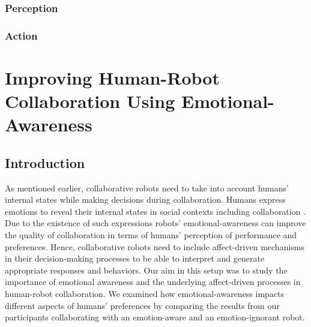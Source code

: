 \documentclass[12pt]{report}
\begin{document}
\subsection{Perception}

\subsection{Action}

\chapter{Improving Human-Robot Collaboration Using Emotional-Awareness}
\label{ch:awareness}

\section{Introduction}

As mentioned earlier, collaborative robots need to take into account humans'
internal states while making decisions during collaboration. Humans express
emotions to reveal their internal states in social contexts including
collaboration \cite{breazeal:sociable-interactive-robots}. Due to the existence
of such expressions robots' emotional-awareness can improve the quality of
collaboration in terms of humans' perception of performance and preferences.
Hence, collaborative robots need to include affect-driven mechanisms in their
decision-making processes to be able to interpret and generate appropriate
responses and behaviors. Our aim in this setup was to study the importance of
emotional awareness and the underlying affect-driven processes in human-robot
collaboration. We examined how emotional-awareness impacts different aspects of
humans' preferences by comparing the results from our participants collaborating
with an emotion-aware and an emotion-ignorant robot.

% 
% 
% 
% 
\end{document}
